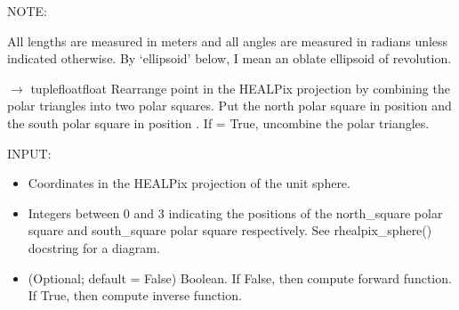 \documentclass[a4paper,12ptopenany,oneside,english]{sphinxmanual}
\begin{document}
\sphinxAtStartPar
NOTE:

\sphinxAtStartPar
All lengths are measured in meters and all angles are measured in radians
unless indicated otherwise.
By ‘ellipsoid’ below, I mean an oblate ellipsoid of revolution.

\begin{fulllineitems}
\label{\detokenize{pj_rhealpix:rhealpixdggs.pj_rhealpix.combine_triangles}}
\pysigstartsignatures
\pysiglinewithargsret
{}
{\sphinxparamcomma {}\sphinxparamcomma {}\sphinxparamcomma {}\sphinxparamcomma {}}
{{ $\rightarrow$ tuple\DUrole{p}{{[}}floatfloat\DUrole{p}{{]}}}}
\pysigstopsignatures
\sphinxAtStartPar
Rearrange point  in the HEALPix projection by
combining the polar triangles into two polar squares.
Put the north polar square in position  and
the south polar square in position .
If  = True, uncombine the polar triangles.

\sphinxAtStartPar
INPUT:
\begin{itemize}
\item {} 
\sphinxAtStartPar
{} \sphinxhyphen{} Coordinates in the HEALPix projection of the unit sphere.

\item {} 
\sphinxAtStartPar
{} \sphinxhyphen{} Integers between 0 and 3 indicating
the positions of the north\_square polar square and south\_square polar
square respectively.
See rhealpix\_sphere() docstring for a diagram.

\item {} 
\sphinxAtStartPar
{} \sphinxhyphen{} (Optional; default = False) Boolean. If False, then compute
forward function. If True, then compute inverse function.


\end{itemize}
\end{fulllineitems}
\end{document}
